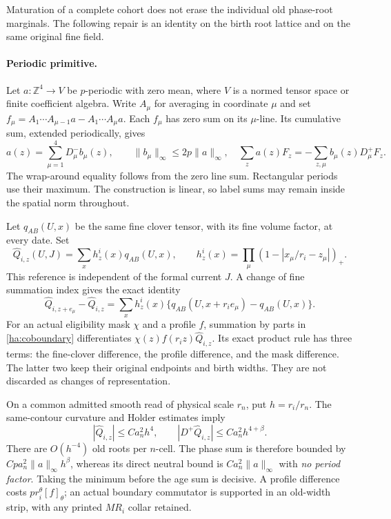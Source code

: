 Maturation of a complete cohort does not erase the individual old
phase-root marginals.  The following repair is an identity on the birth
root lattice and on the same original fine field.

\paragraph{Periodic primitive.}
Let $a:\mathbb Z^4\to V$ be $p$-periodic with zero mean, where $V$ is
a normed tensor space or finite coefficient algebra.  Write $A_\mu$ for
averaging in coordinate $\mu$ and set
$f_\mu=A_1\cdots A_{\mu-1}a-A_1\cdots A_\mu a$.
Each $f_\mu$ has zero sum on its $\mu$-line.  Its cumulative sum, extended
periodically, gives
\begin{equation}
 a(z)=\sum_{\mu=1}^4D^-_\mu b_\mu(z),\qquad
 \|b_\mu\|_\infty\leq2p\|a\|_\infty,
 \quad
 \sum_z a(z)F_z=-\sum_{z,\mu}b_\mu(z)D^+_\mu F_z.
 \label{ha:coboundary}
\end{equation}
The wrap-around equality follows from the zero line sum.  Rectangular
periods use their maximum.  The construction is linear, so label sums
may remain inside the spatial norm throughout.

Let $q_{AB}(U,x)$ be the same fine clover tensor, with its fine volume
factor, at every date.  Set
\begin{equation}
 \widehat Q_{i,z}(U,J)=\sum_xh^i_z(x)q_{AB}(U,x),\qquad
 h^i_z(x)=\prod_\mu(1-|x_\mu/r_i-z_\mu|)_+.
 \label{ha:qhat}
\end{equation}
This reference is independent of the formal current $J$.  A change of
fine summation index gives the exact identity
\begin{equation}
 \widehat Q_{i,z+e_\mu}-\widehat Q_{i,z}
 =\sum_xh^i_z(x)\{q_{AB}(U,x+r_ie_\mu)-q_{AB}(U,x)\}.
 \label{ha:qhat-difference}
\end{equation}
For an actual eligibility mask $\chi$ and a profile $f$, summation by
parts in \eqref{ha:coboundary} differentiates $\chi(z)f(r_iz)\widehat Q_{i,z}$.
Its exact product rule has three terms: the fine-clover difference,
the profile difference, and the mask difference.  The latter two keep
their original endpoints and birth widths.  They are not discarded
as changes of representation.

On a common admitted smooth read of physical scale $r_n$, put $h=r_i/r_n$.
The same-contour curvature and Holder estimates imply
\begin{equation}
 |\widehat Q_{i,z}|\leq Ca_n^2h^4,
 \qquad |D^+\widehat Q_{i,z}|\leq Ca_n^2h^{4+\beta}.
 \label{ha:phase-gain}
\end{equation}
There are $O(h^{-4})$ old roots per $n$-cell.  The phase sum is therefore
bounded by $Cpa_n^2\|a\|_\infty h^\beta$, whereas its direct neutral
bound is $Ca_n^2\|a\|_\infty$ with \emph{no period factor}.  Taking
the minimum before the age sum is decisive.  A profile difference costs
$pr_i^\theta[f]_\theta$; an actual boundary commutator is supported in
an old-width strip, with any printed $MR_i$ collar retained.

